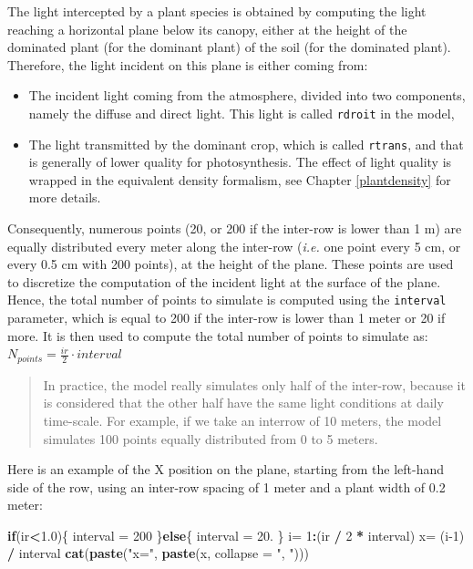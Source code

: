 \documentclass[
]{book}
\newenvironment{Shaded}{\begin{snugshade}}{\end{snugshade}}
\newcommand{\ControlFlowTok}[1]{\textcolor[rgb]{0.13,0.29,0.53}{\textbf{#1}}}
\newcommand{\DataTypeTok}[1]{\textcolor[rgb]{0.13,0.29,0.53}{#1}}
\newcommand{\DecValTok}[1]{\textcolor[rgb]{0.00,0.00,0.81}{#1}}
\newcommand{\FloatTok}[1]{\textcolor[rgb]{0.00,0.00,0.81}{#1}}
\newcommand{\KeywordTok}[1]{\textcolor[rgb]{0.13,0.29,0.53}{\textbf{#1}}}
\newcommand{\NormalTok}[1]{#1}
\newcommand{\OperatorTok}[1]{\textcolor[rgb]{0.81,0.36,0.00}{\textbf{#1}}}
\newcommand{\StringTok}[1]{\textcolor[rgb]{0.31,0.60,0.02}{#1}}
\providecommand{\tightlist}{%
  \setlength{\itemsep}{0pt}\setlength{\parskip}{0pt}}
\begin{document}
The light intercepted by a plant species is obtained by computing the light reaching a horizontal plane below its canopy, either at the height of the dominated plant (for the dominant plant) of the soil (for the dominated plant). Therefore, the light incident on this plane is either coming from:

\begin{itemize}
\tightlist
\item
  The incident light coming from the atmosphere, divided into two components, namely the diffuse and direct light. This light is called \texttt{rdroit} in the model,
\item
  The light transmitted by the dominant crop, which is called \texttt{rtrans}, and that is generally of lower quality for photosynthesis. The effect of light quality is wrapped in the equivalent density formalism, see Chapter \ref{plantdensity} for more details.
\end{itemize}

Consequently, numerous points (20, or 200 if the inter-row is lower than 1 m) are equally distributed every meter along the inter-row (\emph{i.e.} one point every 5 cm, or every 0.5 cm with 200 points), at the height of the plane. These points are used to discretize the computation of the incident light at the surface of the plane.\\
Hence, the total number of points to simulate is computed using the \texttt{interval} parameter, which is equal to 200 if the inter-row is lower than 1 meter or 20 if more. It is then used to compute the total number of points to simulate as: \(N_{points}=\frac{ir}{2}\cdot interval\)

\begin{quote}
In practice, the model really simulates only half of the inter-row, because it is considered that the other half have the same light conditions at daily time-scale. For example, if we take an interrow of 10 meters, the model simulates 100 points equally distributed from 0 to 5 meters.
\end{quote}

Here is an example of the X position on the plane, starting from the left-hand side of the row, using an inter-row spacing of 1 meter and a plant width of 0.2 meter:

\begin{Shaded}
\begin{Highlighting}[]
\ControlFlowTok{if}\NormalTok{(ir}\OperatorTok{<}\FloatTok{1.0}\NormalTok{)\{}
\NormalTok{  interval =}\StringTok{ }\DecValTok{200}
\NormalTok{\}}\ControlFlowTok{else}\NormalTok{\{}
\NormalTok{  interval =}\StringTok{ }\FloatTok{20.}
\NormalTok{\}}
\NormalTok{i=}\StringTok{ }\DecValTok{1}\OperatorTok{:}\NormalTok{(ir }\OperatorTok{/}\StringTok{ }\DecValTok{2} \OperatorTok{*}\StringTok{ }\NormalTok{interval)}
\NormalTok{x=}\StringTok{ }\NormalTok{(i}\DecValTok{-1}\NormalTok{) }\OperatorTok{/}\StringTok{ }\NormalTok{interval}
\KeywordTok{cat}\NormalTok{(}\KeywordTok{paste}\NormalTok{(}\StringTok{"x="}\NormalTok{, }\KeywordTok{paste}\NormalTok{(x, }\DataTypeTok{collapse =} \StringTok{", "}\NormalTok{)))}
\end{Highlighting}
\end{Shaded}
\end{document}
